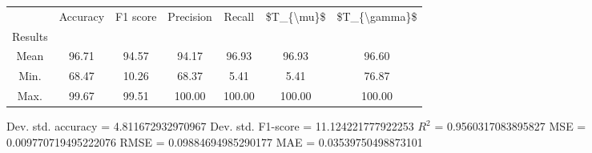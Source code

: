 \begin{tabular}{|c|c|c|c|c|c|c|}
\toprule
{} &  Accuracy &  F1 score &  Precision &  Recall &  \$T\_\{\textbackslash mu\}\$ &  \$T\_\{\textbackslash gamma\}\$ \\
Results &           &           &            &         &            &               \\
\hline
Mean    &     96.71 &     94.57 &      94.17 &   96.93 &      96.93 &         96.60 \\
Min.    &     68.47 &     10.26 &      68.37 &    5.41 &       5.41 &         76.87 \\
Max.    &     99.67 &     99.51 &     100.00 &  100.00 &     100.00 &        100.00 \\
\bottomrule
\end{tabular}

 Dev. std. accuracy = 4.811672932970967
 Dev. std. F1-score = 11.124221777922253
 $R^2$ = 0.9560317083895827
 MSE = 0.009770719495222076
 RMSE = 0.09884694985290177
 MAE = 0.03539750498873101